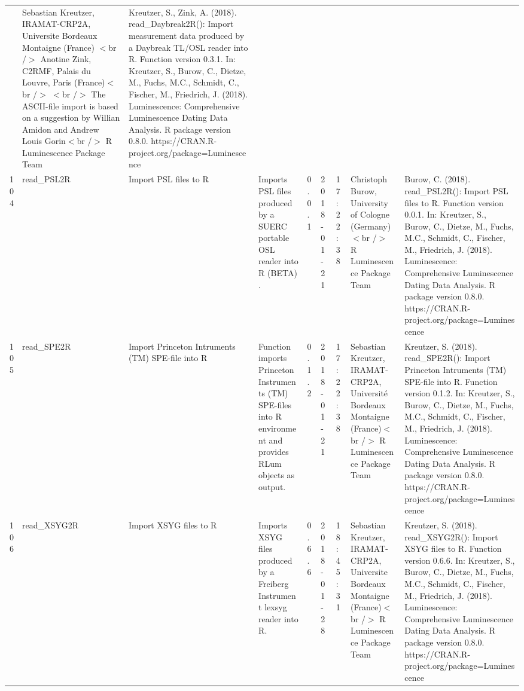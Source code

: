 \begin{table}[ht]
\begin{tabular}{rllllllll}
 & Sebastian Kreutzer, IRAMAT-CRP2A, Universite Bordeaux Montaigne (France) $<$br /$>$ Anotine Zink, C2RMF, Palais du Louvre, Paris (France)$<$br /$>$ $<$br /$>$ The ASCII-file import is based on a suggestion by Willian Amidon and Andrew Louis Gorin$<$br /$>$  R Luminescence Package Team & Kreutzer, S., Zink, A. (2018). read\_Daybreak2R(): Import measurement data produced by a Daybreak TL/OSL reader into R. Function version 0.3.1. In: Kreutzer, S., Burow, C., Dietze, M., Fuchs, M.C., Schmidt, C., Fischer, M., Friedrich, J. (2018). Luminescence: Comprehensive Luminescence Dating Data Analysis. R package version 0.8.0. https://CRAN.R-project.org/package=Luminescence
 \\ 
  104 & read\_PSL2R & Import PSL files to R & Imports PSL files produced by a SUERC portable OSL reader into R  (BETA) . & 0.0.1 & 2018-01-21 & 17:22:38
 & Christoph Burow, University of Cologne (Germany)$<$br /$>$  R Luminescence Package Team & Burow, C. (2018). read\_PSL2R(): Import PSL files to R. Function version 0.0.1. In: Kreutzer, S., Burow, C., Dietze, M., Fuchs, M.C., Schmidt, C., Fischer, M., Friedrich, J. (2018). Luminescence: Comprehensive Luminescence Dating Data Analysis. R package version 0.8.0. https://CRAN.R-project.org/package=Luminescence
 \\ 
  105 & read\_SPE2R & Import Princeton Intruments (TM) SPE-file into R & Function imports Princeton Instruments (TM) SPE-files into R environment and provides  RLum  objects as output. & 0.1.2 & 2018-01-21 & 17:22:38
 & Sebastian Kreutzer, IRAMAT-CRP2A, Université Bordeaux Montaigne (France)$<$br /$>$  R Luminescence Package Team & Kreutzer, S. (2018). read\_SPE2R(): Import Princeton Intruments (TM) SPE-file into R. Function version 0.1.2. In: Kreutzer, S., Burow, C., Dietze, M., Fuchs, M.C., Schmidt, C., Fischer, M., Friedrich, J. (2018). Luminescence: Comprehensive Luminescence Dating Data Analysis. R package version 0.8.0. https://CRAN.R-project.org/package=Luminescence
 \\ 
  106 & read\_XSYG2R & Import XSYG files to R & Imports XSYG files produced by a Freiberg Instrument lexsyg reader into R. & 0.6.6 & 2018-01-28 & 18:45:31
 & Sebastian Kreutzer, IRAMAT-CRP2A, Universite Bordeaux Montaigne (France)$<$br /$>$  R Luminescence Package Team & Kreutzer, S. (2018). read\_XSYG2R(): Import XSYG files to R. Function version 0.6.6. In: Kreutzer, S., Burow, C., Dietze, M., Fuchs, M.C., Schmidt, C., Fischer, M., Friedrich, J. (2018). Luminescence: Comprehensive Luminescence Dating Data Analysis. R package version 0.8.0. https://CRAN.R-project.org/package=Luminescence

\end{tabular}
\end{table}
